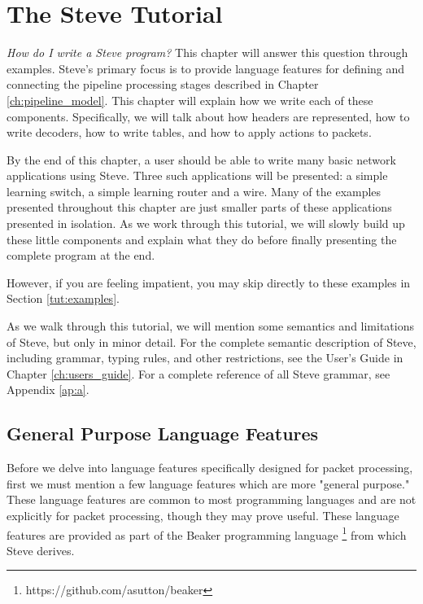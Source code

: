 \chapter{The Steve Tutorial} \label{ch:tutorial}

\textit{How do I write a Steve program?} This chapter will answer this question through examples. Steve's primary focus is to provide language features for defining and connecting the pipeline processing stages described in Chapter \ref{ch:pipeline_model}. This chapter will explain how we write each of these components. Specifically, we will talk about how headers are represented, how to write decoders, how to write tables, and how to apply actions to packets.

By the end of this chapter, a user should be able to write many basic network applications using Steve. Three such applications will be presented: a simple learning switch, a simple learning router and a wire. Many of the examples presented throughout this chapter are just smaller parts of these applications presented in isolation. As we work through this tutorial, we will slowly build up these little components and explain what they do before finally presenting the complete program at the end.  

However, if you are feeling impatient, you may skip directly to these examples in Section \ref{tut:examples}.

As we walk through this tutorial, we will mention some semantics and limitations of Steve, but only in minor detail. For the complete semantic description of Steve, including grammar, typing rules, and other restrictions, see the User's Guide in Chapter \ref{ch:users_guide}. For a complete reference of all Steve grammar, see Appendix \ref{ap:a}.

\section{General Purpose Language Features} \label{tut:gen_purp}

Before we delve into language features specifically designed for packet processing, first we must mention a few language features which are more "general purpose." These language features are common to most programming languages and are not explicitly for packet processing, though they may prove useful. These language features are provided as part of the Beaker programming language \footnote{https://github.com/asutton/beaker} from which Steve derives.

